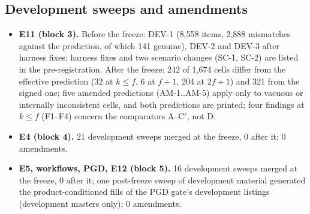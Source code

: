 \documentclass[10pt]{article}
\begin{document}
\subsection{Development sweeps and amendments}
\label{sec:devsweeps}
\begin{itemize}
\item \textbf{E11 (block 3).} Before the freeze: DEV-1 (8,558 items, 2,888 mismatches against the prediction, of which 141
genuine), DEV-2 and DEV-3 after harness fixes; harness fixes and two scenario changes (SC-1, SC-2) are listed in the
pre-registration. After the freeze: 242 of 1,674 cells differ from the effective prediction (32 at $k\le f$, 6 at
$f+1$, 204 at $2f+1$) and 321 from the signed one; five amended predictions (AM-1..AM-5) apply only to vacuous or
internally inconsistent cells, and both predictions are printed; four findings at $k\le f$ (F1--F4) concern the
comparators A--C$'$, not D.
\item \textbf{E4 (block 4).} 21 development sweeps merged at the freeze, 0 after it; 0 amendments.
\item \textbf{E5, workflows, PGD, E12 (block 5).} 16 development sweeps merged at the freeze, 0 after it; one post-freeze
sweep of development material generated the product-conditioned fills of the PGD gate's development listings
(development masters only); 0 amendments.
\end{itemize}
\end{document}
